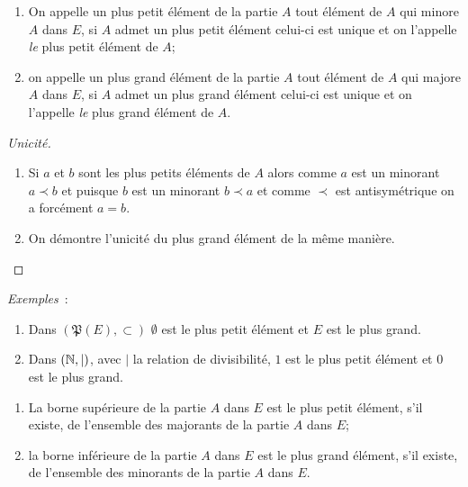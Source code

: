 \begin{defdef}
    \begin{enumerate}
        \item On appelle un plus petit élément de la partie \(A\) tout élément 
            de \(A\) qui minore \(A\) dans \(E\), si \(A\) admet un plus petit 
            élément celui-ci est unique et on l'appelle \emph{le} plus petit 
            élément de \(A\);
        \item on appelle un plus grand élément de la partie \(A\) tout élément 
            de \(A\) qui majore \(A\) dans \(E\), si \(A\) admet un plus grand 
            élément celui-ci est unique et on l'appelle \emph{le} plus grand 
            élément de \(A\).
    \end{enumerate}
\end{defdef}

\begin{proof}[Unicité]
    \begin{enumerate}
        \item Si \(a\) et \(b\) sont les plus petits éléments de \(A\) alors 
            comme \(a\) est un minorant \(a \prec b\) et puisque \(b\) est un 
            minorant \(b \prec a\) et comme \(\prec\) est antisymétrique on a 
            forcément \(a=b\).
        \item On démontre l'unicité du plus grand élément de la même manière.
    \end{enumerate}
\end{proof}

\emph{Exemples}~:
\begin{enumerate}
    \item Dans \((\mathfrak{P}(E), \subset)\) \(\emptyset\) est le plus petit 
        élément et \(E\) est le plus grand.
    \item Dans \((\mathbb{N},|)\), avec \(|\) la relation de divisibilité, \(1\) est le 
        plus petit élément et \(0\) est le plus grand.
\end{enumerate}

\begin{defdef}
    \begin{enumerate}
        \item La borne supérieure de la partie \(A\) dans \(E\) est le plus 
            petit élément, s'il existe, de l'ensemble des majorants de la partie 
            \(A\) dans \(E\);
        \item la borne inférieure de la partie \(A\) dans \(E\) est le plus 
            grand élément, s'il existe, de l'ensemble des minorants de la partie 
            \(A\) dans \(E\).
    \end{enumerate}
\end{defdef}

